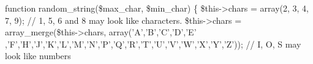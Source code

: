 \begin{ospcode}
function random_string(\$max_char, \$min_char) \{
    \$this->chars = array(2, 3, 4, 7, 9); 
    // 1, 5, 6 and 8 may look like characters.
    \$this->chars = array_merge(\$this->chars, array('A','B','C','D','E'
,'F','H','J','K','L','M','N','P','Q','R','T','U','V','W','X','Y','Z')); 
    // I, O, S may look like numbers
\end{ospcode}
